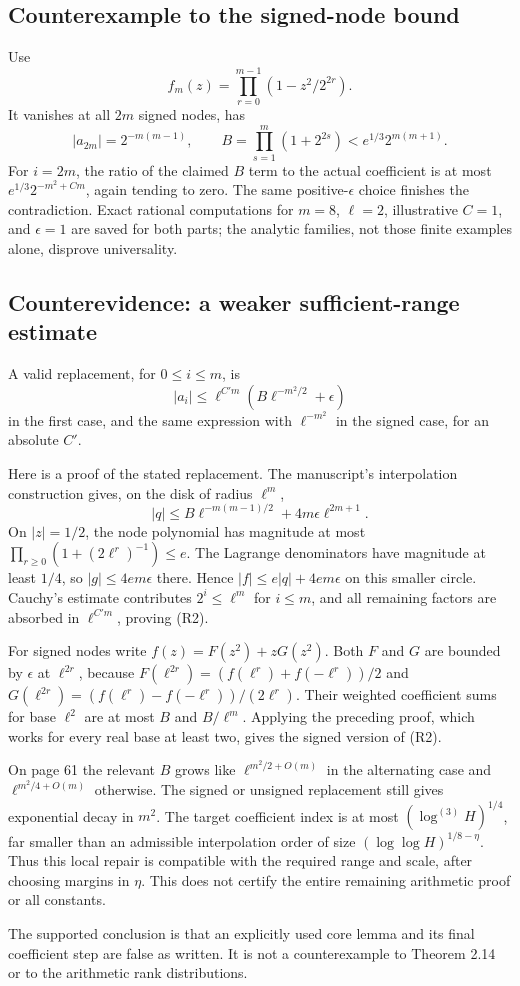 \documentclass[10pt]{article}
\begin{document}
\subsection*{Counterexample to the signed-node bound}
Use \[f_m(z)=\prod_{r=0}^{m-1}(1-z^2/2^{2r}).\] It vanishes at all \(2m\) signed nodes, has \[|a_{2m}|=2^{-m(m-1)},\qquad
 B=\prod_{s=1}^{m}(1+2^{2s})
 <e^{1/3}2^{m(m+1)}.\] For \(i=2m\), the ratio of the claimed \(B\) term to the actual coefficient is at most \(e^{1/3}2^{-m^2+Cm}\), again tending to zero. The same positive-\(\epsilon\) choice finishes the contradiction. Exact rational computations for \(m=8\), \(\ell=2\), illustrative \(C=1\), and \(\epsilon=1\) are saved for both parts; the analytic families, not those finite examples alone, disprove universality.\par
\subsection*{Counterevidence: a weaker sufficient-range estimate}
A valid replacement, for \(0\le i\le m\), is \[|a_i|\le \ell^{C'm}(B\ell^{-m^2/2}+\epsilon)
 \tag{R2}\] in the first case, and the same expression with \(\ell^{-m^2}\) in the signed case, for an absolute \(C'\).\par
Here is a proof of the stated replacement. The manuscript’s interpolation construction gives, on the disk of radius \(\ell^m\), \[|q|\le B\ell^{-m(m-1)/2}
       +4m\epsilon\ell^{2m+1}.\] On \(|z|=1/2\), the node polynomial has magnitude at most \(\prod_{r\ge0}(1+(2\ell^r)^{-1})\le e\). The Lagrange denominators have magnitude at least \(1/4\), so \(|g|\le4em\epsilon\) there. Hence \(|f|\le e|q|+4em\epsilon\) on this smaller circle. Cauchy’s estimate contributes \(2^i\le\ell^m\) for \(i\le m\), and all remaining factors are absorbed in \(\ell^{C'm}\), proving (R2).\par
For signed nodes write \(f(z)=F(z^2)+zG(z^2)\). Both \(F\) and \(G\) are bounded by \(\epsilon\) at \(\ell^{2r}\), because \(F(\ell^{2r})=(f(\ell^r)+f(-\ell^r))/2\) and \(G(\ell^{2r})=(f(\ell^r)-f(-\ell^r))/(2\ell^r)\). Their weighted coefficient sums for base \(\ell^2\) are at most \(B\) and \(B/\ell^m\). Applying the preceding proof, which works for every real base at least two, gives the signed version of (R2).\par
On page 61 the relevant \(B\) grows like \(\ell^{m^2/2+O(m)}\) in the alternating case and \(\ell^{m^2/4+O(m)}\) otherwise. The signed or unsigned replacement still gives exponential decay in \(m^2\). The target coefficient index is at most \((\log^{(3)}H)^{1/4}\), far smaller than an admissible interpolation order of size \((\log\log H)^{1/8-\eta}\). Thus this local repair is compatible with the required range and scale, after choosing margins in \(\eta\). This does not certify the entire remaining arithmetic proof or all constants.\par
The supported conclusion is that an explicitly used core lemma and its final coefficient step are false as written. It is not a counterexample to Theorem 2.14 or to the arithmetic rank distributions.\par
\end{document}

